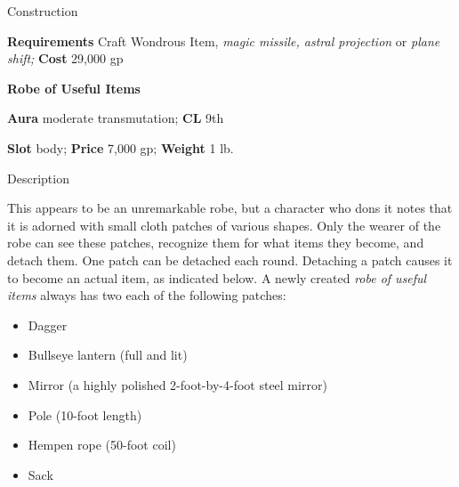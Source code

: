 Construction
				
\textbf{Requirements} Craft Wondrous Item,\textit{ magic missile, astral projection }or\textit{ plane shift;}\textbf{ Cost }29,000 gp
				
\textbf{Robe of Useful Items}
				
\textbf{Aura} moderate transmutation;\textbf{ CL }9th
				
\textbf{Slot} body; \textbf{Price} 7,000 gp; \textbf{Weight} 1 lb.
				
Description
				
This appears to be an unremarkable robe, but a character who dons it notes that it is adorned with small cloth patches of various shapes. Only the wearer of the robe can see these patches, recognize them for what items they become, and detach them. One patch can be detached each round. Detaching a patch causes it to become an actual item, as indicated below. A newly created \textit{robe of useful items} always has two each of the following patches:
				\begin{itemize}\item  Dagger
				\item  Bullseye lantern (full and lit)
				\item  Mirror (a highly polished 2-foot-by-4-foot steel mirror)
				\item  Pole (10-foot length)
				\item  Hempen rope (50-foot coil)
				\item  Sack
\end{itemize}
				
